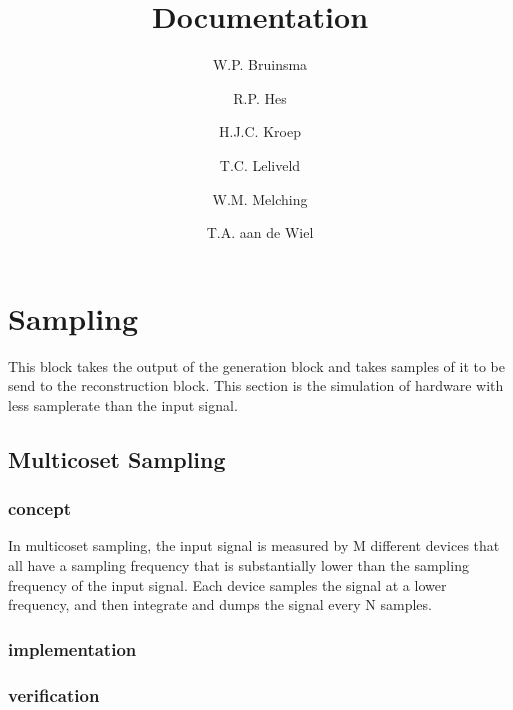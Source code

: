 \documentclass[report, oneside, a4paper, openany]{memoir}
\title{Documentation}
\author{W.P. Bruinsma \and R.P. Hes \and H.J.C. Kroep \and T.C. Leliveld \and W.M. Melching \and T.A. aan de Wiel}
\begin{document}
\chapter{Sampling}
This block takes the output of the generation block and takes samples of it to be send to the reconstruction block. 
This section is the simulation of hardware with less samplerate than the input signal.


\section{Multicoset Sampling}
\subsection{concept}
In multicoset sampling, the input signal is measured by M different devices that all have a sampling frequency that is substantially lower than the sampling frequency of the input signal. Each device samples the signal at a lower frequency, and then integrate and dumps the signal every N samples.

\subsection{implementation}

\subsection{verification}
\end{document}
